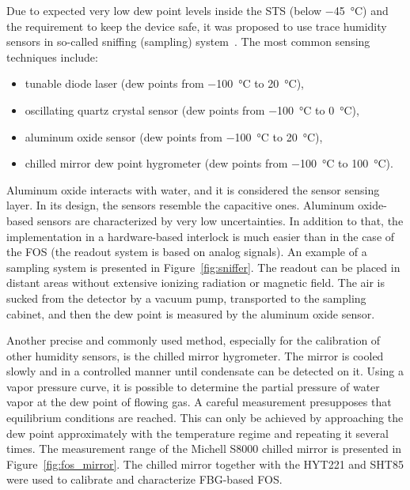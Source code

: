 Due to expected very low dew point levels inside the \gls{STS} (below \SI{-45}{\celsius}) and the requirement to keep the device safe, it was proposed to use trace humidity sensors in so-called sniffing (sampling) system~\cite{Berruti}. The most common sensing techniques include:
\begin{itemize}
    \item tunable diode laser (dew points from \SI{-100}{\celsius} to \SI{20}{\celsius}),
    \item oscillating quartz crystal sensor (dew points from \SI{-100}{\celsius} to \SI{0}{\celsius}),
    \item aluminum oxide sensor (dew points from \SI{-100}{\celsius} to \SI{20}{\celsius}),
    \item chilled mirror dew point hygrometer  (dew points from \SI{-100}{\celsius} to \SI{100}{\celsius}).
\end{itemize}

Aluminum oxide interacts with water, and it is considered the sensor sensing layer. In its design, the sensors resemble the capacitive ones. Aluminum oxide-based sensors are characterized by very low uncertainties. In addition to that, the implementation in a hardware-based interlock is much easier than in the case of the \gls{FOS} (the readout system is based on analog signals). An example of a sampling system is presented in Figure~\ref{fig:sniffer}. The readout can be placed in distant areas without extensive ionizing radiation or magnetic field. The air is sucked from the detector by a vacuum pump, transported to the sampling cabinet, and then the dew point is measured by the aluminum oxide sensor.  

Another precise and commonly used method, especially for the calibration of other humidity sensors, is the chilled mirror hygrometer. The mirror is cooled slowly and in a controlled manner until condensate can be detected on it. Using a vapor pressure curve, it is possible to determine the partial pressure of water vapor at the dew point of flowing gas. A careful measurement presupposes that equilibrium conditions are reached. This can only be achieved by approaching the dew point approximately with the temperature regime and repeating it several times. The measurement range of the Michell S8000 chilled mirror is presented in Figure~\ref{fig:fos_mirror}. The chilled mirror together with the HYT221 and SHT85 were used to calibrate and characterize FBG-based \gls{FOS}. 



